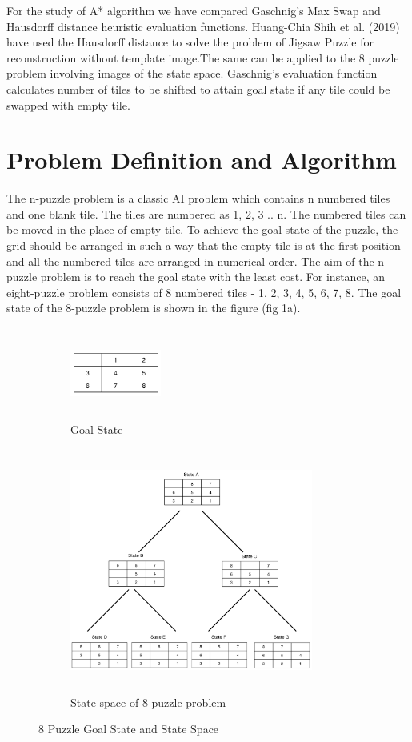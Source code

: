 \documentclass{svproc}
\begin{document}
\noindent For the study of A* algorithm we have compared Gaschnig’s Max Swap and Hausdorff distance heuristic evaluation functions. Huang-Chia Shih et al. (2019) have used the Hausdorff distance to solve the problem of Jigsaw Puzzle for reconstruction without template image.The same can be applied to the 8 puzzle problem involving images of the state space. Gaschnig's evaluation function calculates number of tiles to be shifted to attain goal state if any tile could be swapped with empty tile.

\section{Problem Definition and Algorithm}
\noindent The n-puzzle problem is a classic AI problem which contains n numbered tiles and one blank tile. The tiles are numbered as 1, 2, 3 .. n. The numbered tiles can be moved in the place of empty tile. To achieve the goal state of the puzzle, the grid should be arranged in such a way that the empty tile is at the first position and all the numbered tiles are arranged in numerical order. The aim of the n-puzzle problem is to reach the goal state with the least cost. For instance, an eight-puzzle problem consists of 8 numbered tiles - 1, 2, 3, 4, 5, 6, 7, 8. The goal state of the 8-puzzle problem is shown in the figure (fig 1a). \\

\begin{figure}
	\centering
	\begin{subfigure}[b]{0.25\textwidth}
		\centering
		\includegraphics[width=3cm,height=3cm,keepaspectratio]{GoalState.png}
		\caption{Goal State}
		\label{fig:1a}		
	\end{subfigure}
	\begin{subfigure}[b]{0.6\textwidth}
		\centering
		\includegraphics[width=8cm,height=8cm,keepaspectratio]{ExampleState.png}
		\caption{State space of 8-puzzle problem}
		\label{fig:1b}
	\end{subfigure}
	\caption{8 Puzzle Goal State and State Space}
	\label{fig:1}
\end{figure}
\end{document}
